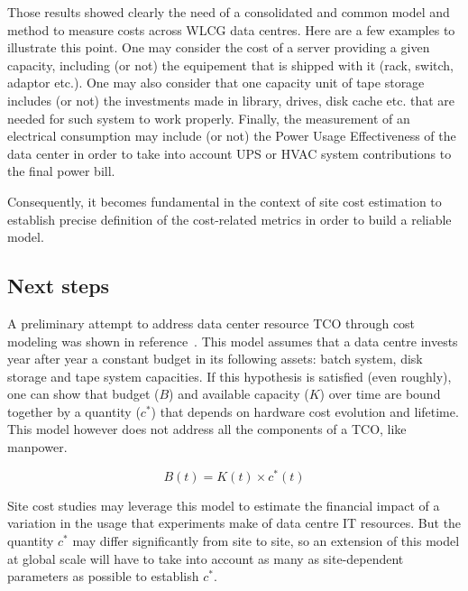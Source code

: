 Those results showed clearly the need of a consolidated and common model and method to measure costs across
WLCG data centres.
Here are a few examples to illustrate this point. One may consider the cost of a server providing a given capacity,
including (or not) the equipement that is shipped with it (rack, switch, adaptor etc.).
One may also consider that one capacity unit of tape storage includes (or not) the investments made in
library, drives, disk cache etc.
that are needed for such system to work properly.
Finally, the measurement of an electrical consumption may include (or not) the Power Usage Effectiveness
of the data center
in order to take into account UPS or HVAC system contributions to the final power bill.

Consequently, it becomes fundamental in the context of site cost
estimation to establish precise definition of the cost-related metrics in order to build a reliable model.

\subsection{Next steps}

A preliminary attempt to address data center resource TCO through cost modeling was shown in reference~\cite{costmodel}.
This model assumes that a data centre invests year after year a constant budget in its following assets:
batch system, disk storage and tape system capacities.
If this hypothesis is satisfied (even roughly), one can show that budget ($B$) and available capacity ($K$) over time are bound
together by a quantity ($c^*$) that depends on hardware cost evolution and lifetime. This model however does not address all the components of a TCO, like manpower.

\begin{equation}
    B (t) = K (t) \times c^* (t)
    \label{eq:costmodel}
\end{equation}

Site cost studies may leverage this model to estimate the financial impact of a variation in the usage that experiments
make of data centre IT resources.
But the quantity $c^*$ may differ significantly from site to site, so an extension of this model at global scale
will have to take into account as many as site-dependent parameters as possible to establish $c^*$.
